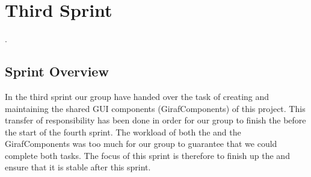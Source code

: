 \part{Third Sprint}
\label{par:third_sprint}

.

\chapter{Sprint Overview}
In the third sprint our group have handed over the task of creating and maintaining the shared GUI components (GirafComponents) of this project. This transfer of responsibility has been done in order for our group to finish the \ct before the start of the fourth sprint. The workload of both the \ct and the GirafComponents was too much for our group to guarantee that we could complete both tasks. The focus of this sprint is therefore to finish up the \ct and ensure that it is stable after this sprint.




